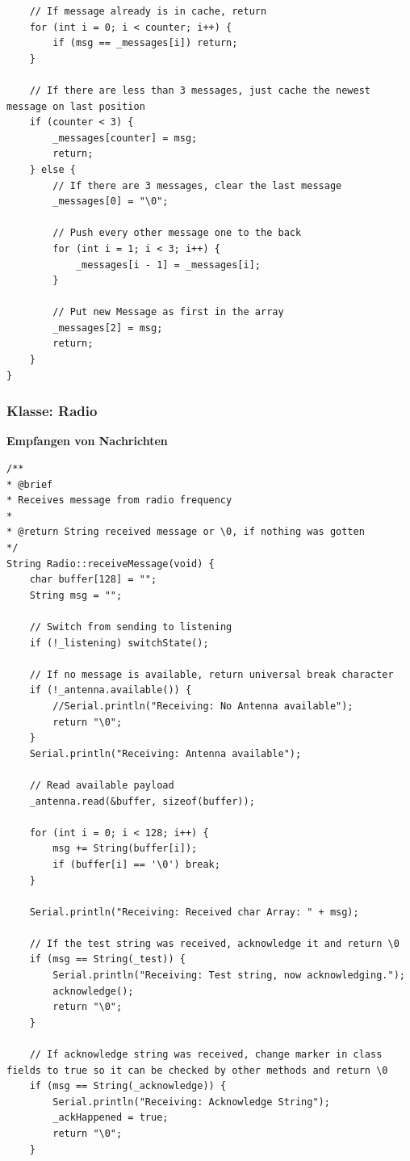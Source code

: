 \documentclass[a4paper, 11pt]{scrartcl}
\begin{document}
\begin{small}
\begin{lstlisting}
    // If message already is in cache, return
    for (int i = 0; i < counter; i++) {
        if (msg == _messages[i]) return;
    }

    // If there are less than 3 messages, just cache the newest message on last position
    if (counter < 3) {
        _messages[counter] = msg;
        return;
    } else {
        // If there are 3 messages, clear the last message
        _messages[0] = "\0";

        // Push every other message one to the back
        for (int i = 1; i < 3; i++) {
            _messages[i - 1] = _messages[i];
        }

        // Put new Message as first in the array
        _messages[2] = msg;
        return;
    }
}
\end{lstlisting}

\subsubsection{Klasse: Radio}
\textbf{Empfangen von Nachrichten}\label{code:receive}
\begin{lstlisting}
/**
* @brief 
* Receives message from radio frequency
* 
* @return String received message or \0, if nothing was gotten
*/
String Radio::receiveMessage(void) {
    char buffer[128] = "";
    String msg = "";

    // Switch from sending to listening
    if (!_listening) switchState();

    // If no message is available, return universal break character
    if (!_antenna.available()) {
        //Serial.println("Receiving: No Antenna available");
        return "\0";
    }
    Serial.println("Receiving: Antenna available");

    // Read available payload
    _antenna.read(&buffer, sizeof(buffer));

    for (int i = 0; i < 128; i++) {
        msg += String(buffer[i]);
        if (buffer[i] == '\0') break;
    }

    Serial.println("Receiving: Received char Array: " + msg);

    // If the test string was received, acknowledge it and return \0
    if (msg == String(_test)) {
        Serial.println("Receiving: Test string, now acknowledging.");
        acknowledge();
        return "\0";
    }

    // If acknowledge string was received, change marker in class fields to true so it can be checked by other methods and return \0
    if (msg == String(_acknowledge)) {
        Serial.println("Receiving: Acknowledge String");
        _ackHappened = true;
        return "\0";
    }


\end{lstlisting}
\end{small}
\end{document}
